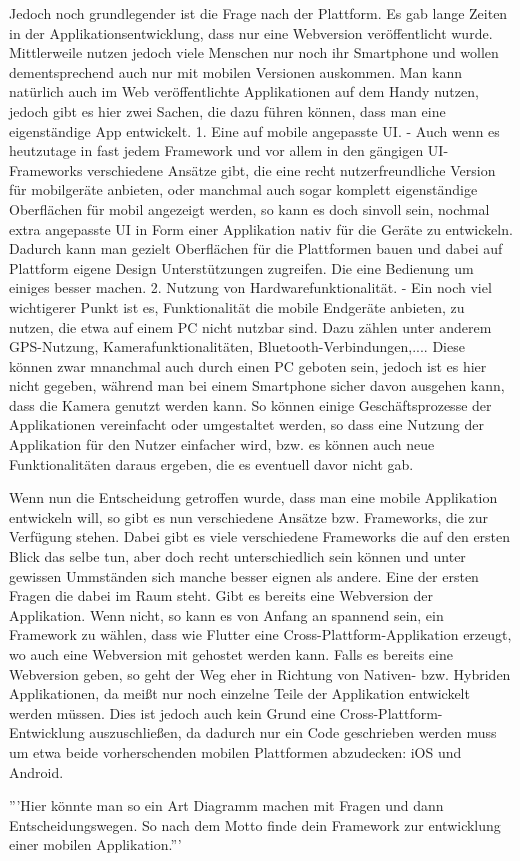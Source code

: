 Jedoch noch grundlegender ist die Frage nach der Plattform. Es gab lange Zeiten in der Applikationsentwicklung, dass nur eine Webversion veröffentlicht wurde. Mittlerweile nutzen jedoch viele Menschen nur noch ihr Smartphone und wollen dementsprechend auch nur mit mobilen Versionen auskommen. Man kann natürlich auch im Web veröffentlichte Applikationen auf dem Handy nutzen, jedoch gibt es hier zwei Sachen, die dazu führen können, dass man eine eigenständige App entwickelt.
1. Eine auf mobile angepasste UI. - Auch wenn es heutzutage in fast jedem Framework und vor allem in den gängigen UI-Frameworks verschiedene Ansätze gibt, die eine recht nutzerfreundliche Version für mobilgeräte anbieten, oder manchmal auch sogar komplett eigenständige Oberflächen für mobil angezeigt werden, so kann es doch sinvoll sein, nochmal extra angepasste UI in Form einer Applikation nativ für die Geräte zu entwickeln. Dadurch kann man gezielt Oberflächen für die Plattformen bauen und dabei auf Plattform eigene Design Unterstützungen zugreifen. Die eine Bedienung um einiges besser machen.
2. Nutzung von Hardwarefunktionalität. -  Ein noch viel wichtigerer Punkt ist es, Funktionalität die mobile Endgeräte anbieten, zu nutzen, die etwa auf einem PC nicht nutzbar sind. Dazu zählen unter anderem GPS-Nutzung, Kamerafunktionalitäten, Bluetooth-Verbindungen,.... Diese können zwar mnanchmal auch durch einen PC geboten sein, jedoch ist es hier nicht gegeben, während man bei einem Smartphone sicher davon ausgehen kann, dass die Kamera genutzt werden kann. So können einige Geschäftsprozesse der Applikationen vereinfacht oder umgestaltet werden, so dass eine Nutzung der Applikation für den Nutzer einfacher wird, bzw. es können auch neue Funktionalitäten daraus ergeben, die es eventuell davor nicht gab.

Wenn nun die Entscheidung getroffen wurde, dass man eine mobile Applikation entwickeln will, so gibt es nun verschiedene Ansätze bzw. Frameworks, die zur Verfügung stehen. Dabei gibt es viele verschiedene Frameworks die auf den ersten Blick das selbe tun, aber doch recht unterschiedlich sein können und unter gewissen Ummständen sich manche besser eignen als andere. 
Eine der ersten Fragen die dabei im Raum steht. Gibt es bereits eine Webversion der Applikation.
Wenn nicht, so kann es von Anfang an spannend sein, ein Framework zu wählen, dass wie Flutter eine Cross-Plattform-Applikation erzeugt, wo auch eine Webversion mit gehostet werden kann.
Falls es bereits eine Webversion geben, so geht der Weg eher in Richtung von Nativen- bzw. Hybriden Applikationen, da meißt nur noch einzelne Teile der Applikation entwickelt werden müssen. Dies ist jedoch auch kein Grund eine Cross-Plattform-Entwicklung auszuschließen, da dadurch nur ein Code geschrieben werden muss um etwa beide vorherschenden mobilen Plattformen abzudecken: iOS und Android.

'''Hier könnte man so ein Art Diagramm machen mit Fragen und dann Entscheidungswegen. So nach dem Motto finde dein Framework zur entwicklung einer mobilen Applikation.'''



